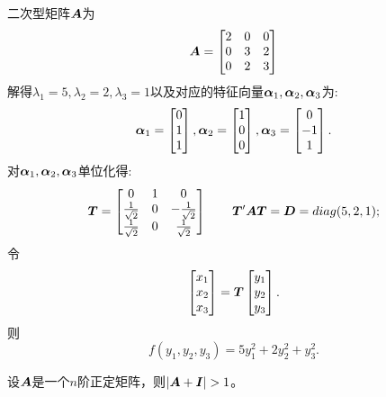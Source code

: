 \documentclass[lang=cn,11pt,normal]{elegantbook}
\begin{document}
	\begin{solution}
		二次型矩阵$\AA$为
		\begin{equation}
		\AA=
		\begin{bmatrix}
		2&0&0\\
		0&3&2\\
		0&2&3
		\end{bmatrix}
		\end{equation}
		解得$\lambda_1=5,\lambda_2=2,\lambda_3=1$以及对应的特征向量$\bfaf_1,\bfaf_2,\bfaf_3$为:
		\begin{equation}
		\bfaf_1=
		\begin{bmatrix}
		0\\1\\1
		\end{bmatrix},
		\bfaf_2=
		\begin{bmatrix}
		1\\0\\0
		\end{bmatrix},
		\bfaf_3=
		\begin{bmatrix}
		0\\-1\\1
		\end{bmatrix}.
		\end{equation}
		对$\bfaf_1,\bfaf_2,\bfaf_3$单位化得:
		\begin{equation}
		\TT=
		\begin{bmatrix}
		0&1&0\\
		\frac{1}{\sqrt{2}}&0&-\frac{1}{\sqrt{2}}\\
		\frac{1}{\sqrt{2}}&0&\frac{1}{\sqrt{2}}
		\end{bmatrix}
		\qquad\TT'\AA\TT=\DD=diag(5,2,1);
		\end{equation}
		令
		\begin{equation}
		\begin{bmatrix}
		x_1\\x_2\\x_3
		\end{bmatrix}
		=
		\TT
		\begin{bmatrix}
		y_1\\y_2\\y_3
		\end{bmatrix}.
		\end{equation}
		则
		\begin{equation}
		f(y_1,y_2,y_3)=5y_1^2+2y_2^2+y_3^2.
		\end{equation}
	\end{solution}
	\begin{exercise}
		设$\AA$是一个$n$阶正定矩阵，则$|\AA+\II|>1$。
	\end{exercise}
\end{document}
